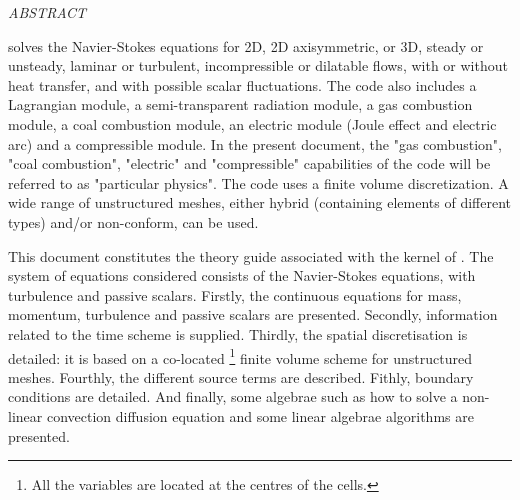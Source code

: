 
%
%
%
%


\vspace*{0.1cm}
\begin{center}
\medskip
\textit{ABSTRACT}
\end{center}
\vspace*{1cm}

\CS solves the Navier-Stokes equations for 2D, 2D axisymmetric, or 3D,
steady or unsteady, laminar or turbulent, incompressible or dilatable
flows, with or without heat transfer, and with possible scalar
fluctuations. The code also includes a Lagrangian module, a
semi-transparent radiation module, a gas combustion module, a coal
combustion module, an electric module (Joule effect and electric arc)
and a compressible module. In the present document, the "gas
combustion", "coal combustion", "electric" and "compressible"
capabilities of the code will be referred to as "particular
physics". The code uses a finite volume discretization. A wide range
of unstructured meshes, either hybrid (containing elements of
different types) and/or non-conform, can be used.

This document constitutes the theory guide
associated with the kernel of \CS.
The system of equations considered consists of the
Navier-Stokes equations, with turbulence and passive scalars. Firstly, the
continuous equations for mass, momentum, turbulence and passive scalars are
presented. Secondly, information related to the time scheme is supplied.
Thirdly, the spatial discretisation is detailed: it is based on a co-located%
\footnote{%
All the variables are located at the centres of the cells.} finite volume
scheme for unstructured meshes. Fourthly, the different source terms are 
described. Fithly, boundary conditions are detailed. And finally, some algebrae
such as how to solve a non-linear convection diffusion equation and some 
linear algebrae algorithms are presented.


